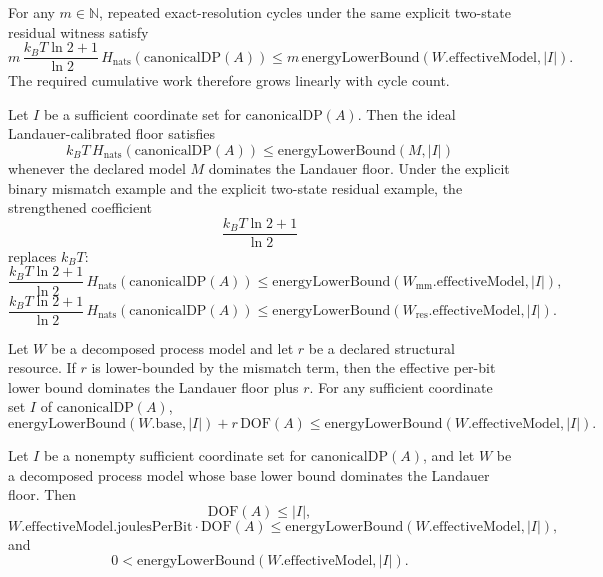 \begin{proposition}\label{prop:binary-residual-cumulative-work}
For any $m \in \mathbb{N}$, repeated exact-resolution cycles under the same explicit two-state residual witness satisfy
\[
m\,\frac{k_B T \ln 2 + 1}{\ln 2}
\, H_{\mathrm{nats}}(\mathrm{canonicalDP}(A))
\le
m\,\mathrm{energyLowerBound}(W.\mathrm{effectiveModel},|I|).
\]
The required cumulative work therefore grows linearly with cycle count.
\end{proposition}

\begin{proposition}\label{prop:ei-hierarchy}
Let $I$ be a sufficient coordinate set for $\mathrm{canonicalDP}(A)$. Then the ideal Landauer-calibrated floor satisfies
\[
k_B T\,H_{\mathrm{nats}}(\mathrm{canonicalDP}(A))
\le
\mathrm{energyLowerBound}(M,|I|)
\]
whenever the declared model $M$ dominates the Landauer floor. Under the explicit binary mismatch example and the explicit two-state residual example, the strengthened coefficient
\[
\frac{k_B T \ln 2 + 1}{\ln 2}
\]
replaces $k_B T$:
\[
\frac{k_B T \ln 2 + 1}{\ln 2}
\,H_{\mathrm{nats}}(\mathrm{canonicalDP}(A))
\le
\mathrm{energyLowerBound}(W_{\mathrm{mm}}.\mathrm{effectiveModel},|I|),
\]
\[
\frac{k_B T \ln 2 + 1}{\ln 2}
\,H_{\mathrm{nats}}(\mathrm{canonicalDP}(A))
\le
\mathrm{energyLowerBound}(W_{\mathrm{res}}.\mathrm{effectiveModel},|I|).
\]
\end{proposition}

\begin{proposition}\label{prop:structural-resource-overhead}
Let $W$ be a decomposed process model and let $r$ be a declared structural resource. If $r$ is lower-bounded by the mismatch term, then the effective per-bit lower bound dominates the Landauer floor plus $r$. For any sufficient coordinate set $I$ of $\mathrm{canonicalDP}(A)$,
\[
\mathrm{energyLowerBound}(W.\mathrm{base},|I|) + r\,\mathrm{DOF}(A)
\le
\mathrm{energyLowerBound}(W.\mathrm{effectiveModel},|I|).
\]
\end{proposition}

\begin{proposition}\label{prop:canonical-wolpert-bundle}
Let $I$ be a nonempty sufficient coordinate set for $\mathrm{canonicalDP}(A)$, and let $W$ be a decomposed process model whose base lower bound dominates the Landauer floor. Then
\[
\mathrm{DOF}(A) \le |I|,
\]
\[
W.\mathrm{effectiveModel}.\mathrm{joulesPerBit}\cdot\mathrm{DOF}(A)
\le
\mathrm{energyLowerBound}(W.\mathrm{effectiveModel},|I|),
\]
and
\[
0 < \mathrm{energyLowerBound}(W.\mathrm{effectiveModel},|I|).
\]
\end{proposition}

